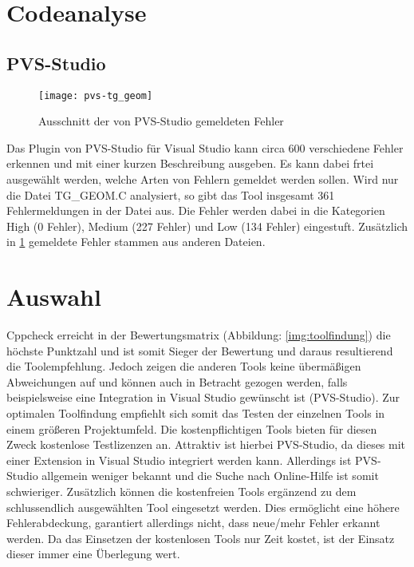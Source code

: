 \section{Codeanalyse}
\label{sec:codeanalyse}

\subsection{PVS-Studio}

\begin{figure}[htpb]
  \centering
  \texttt{[image: pvs-tg\_geom]}
  \caption{Ausschnitt der von PVS-Studio gemeldeten Fehler}
  \label{img:pvs-tg_geom}
\end{figure}

Das Plugin von PVS-Studio für Visual Studio kann circa 600 verschiedene Fehler erkennen und mit einer kurzen Beschreibung ausgeben. Es kann dabei frtei ausgewählt werden, welche Arten von
Fehlern gemeldet werden sollen. \newline
Wird nur die Datei \glqq{}TG_GEOM.C\grqq{} analysiert, so gibt das Tool insgesamt 361 Fehlermeldungen in der Datei aus. Die Fehler werden dabei in die Kategorien \glqq{}High\grqq{}
(0 Fehler), \glqq{}Medium\grqq{} (227 Fehler) und \glqq{}Low\grqq{} (134 Fehler) eingestuft. Zusätzlich in \ref{img:pvs-tg_geom} gemeldete Fehler stammen aus anderen Dateien.

\section{Auswahl}
\label{sec:auswahl}

Cppcheck erreicht in der Bewertungsmatrix (Abbildung: \ref{img:toolfindung}) die höchste Punktzahl und ist somit Sieger der Bewertung und daraus resultierend die Toolempfehlung.
Jedoch zeigen die anderen Tools keine übermäßigen Abweichungen auf und können auch in Betracht gezogen werden, falls beispielsweise eine Integration in Visual Studio gewünscht ist
(PVS-Studio). \newline
Zur optimalen Toolfindung empfiehlt sich somit das Testen der einzelnen Tools in einem größeren Projektumfeld. Die kostenpflichtigen Tools bieten für diesen Zweck kostenlose
Testlizenzen an. Attraktiv ist hierbei PVS-Studio, da dieses mit einer Extension in Visual Studio integriert werden kann. Allerdings ist PVS-Studio allgemein weniger bekannt und die Suche nach Online-Hilfe ist somit schwieriger. \newline
Zusätzlich können die kostenfreien Tools ergänzend zu dem schlussendlich ausgewählten Tool eingesetzt werden. Dies ermöglicht eine höhere Fehlerabdeckung, garantiert allerdings nicht,
dass neue/mehr Fehler erkannt werden. Da das Einsetzen der kostenlosen Tools nur Zeit kostet, ist der Einsatz dieser immer eine Überlegung wert.